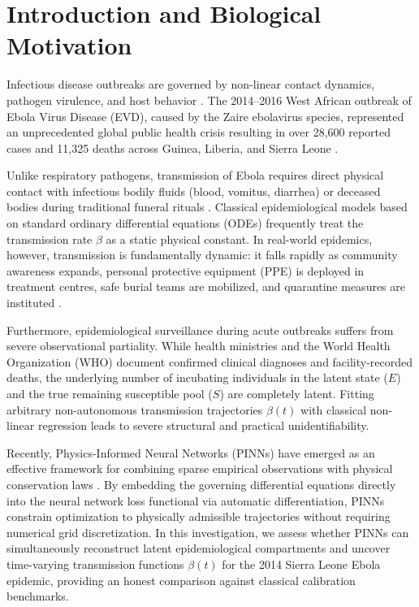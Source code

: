 \documentclass[11pt,a4paper]{article}
\begin{document}
\section{Introduction and Biological Motivation}
Infectious disease outbreaks are governed by non-linear contact dynamics, pathogen virulence, and host behavior \cite{kermack1927contribution,hethcote2000mathematics}. The 2014--2016 West African outbreak of Ebola Virus Disease (EVD), caused by the Zaire ebolavirus species, represented an unprecedented global public health crisis resulting in over 28,600 reported cases and 11,325 deaths across Guinea, Liberia, and Sierra Leone \cite{who2014ebola,who2014situation}. 

Unlike respiratory pathogens, transmission of Ebola requires direct physical contact with infectious bodily fluids (blood, vomitus, diarrhea) or deceased bodies during traditional funeral rituals \cite{legrand2007understanding,chowell2004basic}. Classical epidemiological models based on standard ordinary differential equations (ODEs) frequently treat the transmission rate $\beta$ as a static physical constant. In real-world epidemics, however, transmission is fundamentally dynamic: it falls rapidly as community awareness expands, personal protective equipment (PPE) is deployed in treatment centres, safe burial teams are mobilized, and quarantine measures are instituted \cite{rivers2014modeling,althaus2014estimating,king2015avoidable}.

Furthermore, epidemiological surveillance during acute outbreaks suffers from severe observational partiality. While health ministries and the World Health Organization (WHO) document confirmed clinical diagnoses and facility-recorded deaths, the underlying number of incubating individuals in the latent state ($E$) and the true remaining susceptible pool ($S$) are completely latent. Fitting arbitrary non-autonomous transmission trajectories $\beta(t)$ with classical non-linear regression leads to severe structural and practical unidentifiability.

Recently, Physics-Informed Neural Networks (PINNs) have emerged as an effective framework for combining sparse empirical observations with physical conservation laws \cite{raissi2019physics,cuomo2022scientific}. By embedding the governing differential equations directly into the neural network loss functional via automatic differentiation, PINNs constrain optimization to physically admissible trajectories without requiring numerical grid discretization. In this investigation, we assess whether PINNs can simultaneously reconstruct latent epidemiological compartments and uncover time-varying transmission functions $\beta(t)$ for the 2014 Sierra Leone Ebola epidemic, providing an honest comparison against classical calibration benchmarks.
\end{document}
